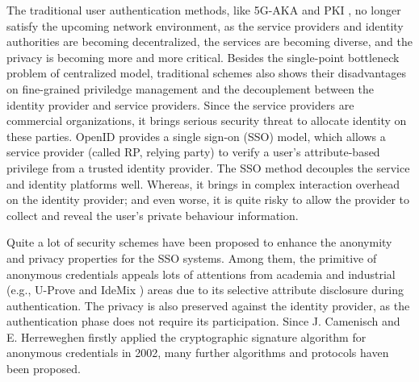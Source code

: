 \documentclass[journal]{IEEEtran}
\begin{document}
The traditional user authentication methods, like 5G-AKA \cite{3gpp.33.501} and PKI \cite{rfc5280}, no longer satisfy the upcoming network environment, as the service providers and identity authorities are becoming decentralized, the services are becoming diverse, and the privacy is becoming more and more critical. Besides the single-point bottleneck problem of centralized model, traditional schemes also shows their disadvantages on fine-grained priviledge management and the decouplement between the identity provider and service providers. Since the service providers are commercial organizations, it brings serious security threat to allocate identity on these parties. OpenID \cite{rfc6616} provides a single sign-on (SSO) model, which allows a service provider (called RP, relying party) to verify a user's attribute-based privilege from a trusted identity provider. The SSO method decouples the service and identity platforms well. Whereas, it brings in complex interaction overhead on the identity provider; and even worse, it is quite risky to allow the provider to collect and reveal the user's private behaviour information. 


Quite a lot of security schemes have been proposed to enhance the anonymity and privacy properties for the SSO systems. Among them, the primitive of anonymous credentials \cite{camenisch2002design} appeals lots of attentions from academia and industrial (e.g., U-Prove \cite{paquin2011u} and IdeMix \cite{camenisch2004signature}) areas due to its selective attribute disclosure during authentication. 
The privacy is also preserved against the identity provider, as the authentication phase does not require its participation.
Since J. Camenisch and E. Herreweghen firstly applied the cryptographic signature algorithm \cite{camenisch2002design} for anonymous credentials in 2002, many further algorithms \cite{camenisch2004signature, pointcheval2016short} and protocols \cite{elpasso, yu2020blockchainbased} haven been proposed.
\end{document}
